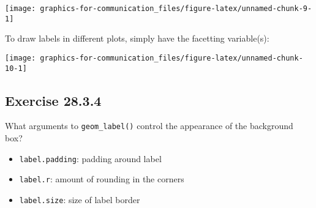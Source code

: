 \documentclass[]{book}
\newenvironment{Shaded}{\begin{snugshade}}{\end{snugshade}}
\newcommand{\DataTypeTok}[1]{\textcolor[rgb]{0.13,0.29,0.53}{#1}}
\newcommand{\DecValTok}[1]{\textcolor[rgb]{0.00,0.00,0.81}{#1}}
\newcommand{\KeywordTok}[1]{\textcolor[rgb]{0.13,0.29,0.53}{\textbf{#1}}}
\newcommand{\NormalTok}[1]{#1}
\newcommand{\OperatorTok}[1]{\textcolor[rgb]{0.81,0.36,0.00}{\textbf{#1}}}
\newcommand{\OtherTok}[1]{\textcolor[rgb]{0.56,0.35,0.01}{#1}}
\newcommand{\StringTok}[1]{\textcolor[rgb]{0.31,0.60,0.02}{#1}}
\providecommand{\tightlist}{%
  \setlength{\itemsep}{0pt}\setlength{\parskip}{0pt}}
\theoremstyle{plain}
\theoremstyle{remark}
\theoremstyle{definition}
\theoremstyle{definition}
\theoremstyle{definition}
\theoremstyle{remark}
\begin{document}
\begin{center}\texttt{[image: graphics-for-communication\_files/figure-latex/unnamed-chunk-9-1]} \end{center}

To draw labels in different plots, simply have the facetting
variable(s):

\begin{Shaded}
\end{Shaded}

\begin{center}\texttt{[image: graphics-for-communication\_files/figure-latex/unnamed-chunk-10-1]} \end{center}

\hypertarget{exercise-28.3.4}{%
\subsection*{\texorpdfstring{Exercise
{28.3.4}}{Exercise 28.3.4}}\label{exercise-28.3.4}}

What arguments to \texttt{geom\_label()} control the appearance of the
background box?

\begin{itemize}
\tightlist
\item
  \texttt{label.padding}: padding around label
\item
  \texttt{label.r}: amount of rounding in the corners
\item
  \texttt{label.size}: size of label border
\end{itemize}
\end{document}
